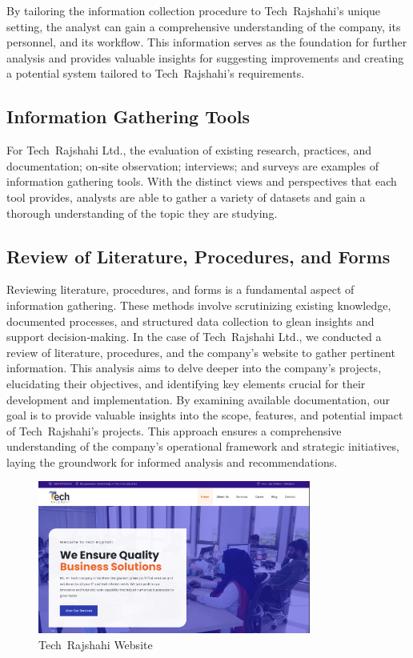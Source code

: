 \documentclass[12pt,a4paper]{article}
\begin{document}
By tailoring the information collection procedure to Tech Rajshahi’s unique setting, the analyst can gain a comprehensive understanding of the company, its personnel, and its workflow.  This information serves as the foundation for further analysis and provides valuable insights for suggesting improvements and creating a potential system tailored to Tech Rajshahi’s requirements.

\subsection{Information Gathering Tools}
For Tech Rajshahi Ltd., the evaluation of existing research, practices, and documentation; on‑site observation; interviews; and surveys are examples of information gathering tools.  With the distinct views and perspectives that each tool provides, analysts are able to gather a variety of datasets and gain a thorough understanding of the topic they are studying.

\subsection{Review of Literature, Procedures, and Forms}
Reviewing literature, procedures, and forms is a fundamental aspect of information gathering.  These methods involve scrutinizing existing knowledge, documented processes, and structured data collection to glean insights and support decision‑making.  In the case of Tech Rajshahi Ltd., we conducted a review of literature, procedures, and the company’s website to gather pertinent information.  This analysis aims to delve deeper into the company’s projects, elucidating their objectives, and identifying key elements crucial for their development and implementation.  By examining available documentation, our goal is to provide valuable insights into the scope, features, and potential impact of Tech Rajshahi’s projects.  This approach ensures a comprehensive understanding of the company’s operational framework and strategic initiatives, laying the groundwork for informed analysis and recommendations.

\begin{figure}[H]
    \centering
    \includegraphics[width=0.8\textwidth]{Fig/tech_website.png}
    \caption{Tech Rajshahi Website}
    \label{fig:tech_website}
\end{figure}
\end{document}
